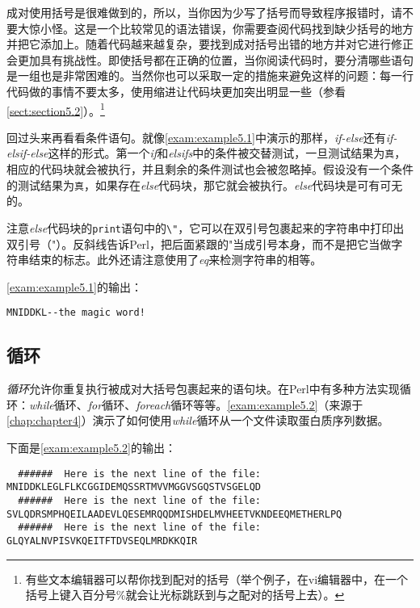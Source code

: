 成对使用括号是很难做到的，所以，当你因为少写了括号而导致程序报错时，请不要大惊小怪。这是一个比较常见的语法错误，你需要查阅代码找到缺少括号的地方并把它添加上。随着代码越来越复杂，要找到成对括号出错的地方并对它进行修正会更加具有挑战性。即使括号都在正确的位置，当你阅读代码时，要分清哪些语句是一组也是非常困难的。当然你也可以采取一定的措施来避免这样的问题：每一行代码做的事情不要太多，使用缩进让代码块更加突出明显一些（参看\autoref{sect:section5.2}）。\footnote{有些文本编辑器可以帮你找到配对的括号（举个例子，在vi编辑器中，在一个括号上键入百分号\%就会让光标跳跃到与之配对的括号上去）。} 

回过头来再看看条件语句。就像\autoref{exam:example5.1}中演示的那样，\textit{if-else}还有\textit{if-elsif-else}这样的形式。第一个\textit{if}和\textit{elsifs}中的条件被交替测试，一旦测试结果为\verb|真|，相应的代码块就会被执行，并且剩余的条件测试也会被忽略掉。假设没有一个条件的测试结果为\verb|真|，如果存在\textit{else}代码块，那它就会被执行。\textit{else}代码块是可有可无的。



注意\textit{else}代码块的\verb|print|语句中的\verb|\"|，它可以在双引号包裹起来的字符串中打印出双引号（"）。反斜线告诉Perl，把后面紧跟的"当成引号本身，而不是把它当做字符串结束的标志。此外还请注意使用了\textit{eq}来检测字符串的相等。

\autoref{exam:example5.1}的输出：

\begin{lstlisting}
MNIDDKL--the magic word!
\end{lstlisting}

\subsection{循环}
\textit{循环}允许你重复执行被成对大括号包裹起来的语句块。在Perl中有多种方法实现循环：\textit{while}循环、\textit{for}循环、\textit{foreach}循环等等。\autoref{exam:example5.2}（来源于\autoref{chap:chapter4}）演示了如何使用\textit{while}循环从一个文件读取蛋白质序列数据。



下面是\autoref{exam:example5.2}的输出：

\begin{lstlisting}
  ######  Here is the next line of the file:
MNIDDKLEGLFLKCGGIDEMQSSRTMVVMGGVSGQSTVSGELQD
  ######  Here is the next line of the file:
SVLQDRSMPHQEILAADEVLQESEMRQQDMISHDELMVHEETVKNDEEQMETHERLPQ
  ######  Here is the next line of the file:
GLQYALNVPISVKQEITFTDVSEQLMRDKKQIR
\end{lstlisting}

